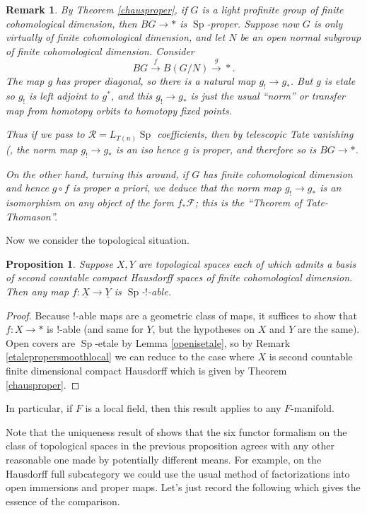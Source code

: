 \documentclass[12pt]{article}
\newtheorem{proposition}[theorem]{Proposition}
\newtheorem{remark}[theorem]{Remark}
\newcommand{\on}{\operatorname}
\newcommand{\mc}{\mathcal}
\begin{document}
\begin{remark}\label{tn}
By Theorem \ref{chausproper}, if $G$ is a light profinite group of finite cohomological dimension, then $BG\to \ast$ is $\on{Sp}$-proper.  Suppose now $G$ is only \emph{virtually} of finite cohomological dimension, and let $N$ be an open normal subgroup of finite cohomological dimension.  Consider
$$BG \overset{f}{\to} B(G/N) \overset{g}{\to} \ast.$$
The map $g$ has proper diagonal, so there is a natural map $g_! \to g_\ast$.  But $g$ is etale so $g_!$ is left adjoint to $g^\ast$, and this $g_! \to g_\ast$ is just the usual ``norm'' or transfer map from homotopy orbits to homotopy fixed points.

Thus if we pass to $\mathcal{R}=L_{T(n)}\on{Sp}$ coefficients, then by telescopic Tate vanishing (\cite{KuhnTate}, the norm map $g_! \to g_\ast$ is an iso hence $g$ is proper, and therefore so is $BG\to \ast$.

On the other hand, turning this around, if $G$ has finite cohomological dimension and hence $g\circ f$ is proper a priori, we deduce that the norm map $g_! \to g_\ast$ is an isomorphism on any object of the form $f_\ast\mc{F}$; this is the ``Theorem of Tate-Thomason''.
\end{remark}

Now we consider the topological situation.

\begin{proposition}\label{LCHaus}
Suppose $X,Y$ are topological spaces each of which admits a basis of second countable compact Hausdorff spaces of finite cohomological dimension.  Then any map $f:\underline{X}\to\underline{Y}$ is $\on{Sp}$-$!$-able.
\end{proposition}
\begin{proof}
Because $!$-able maps are a geometric class of maps, it suffices to show that $f:X \to \ast$ is $!$-able (and same for $Y$, but the hypotheses on $X$ and $Y$ are the same).  Open covers are $\on{Sp}$-etale by Lemma \ref{openisetale}, so by Remark \ref{etalepropersmoothlocal} we can reduce to the case where $X$ is second countable finite dimensional compact Hausdorff which is given by Theorem \ref{chausproper}.
\end{proof}

In particular, if $F$ is a local field, then this result applies to any $F$-manifold.

Note that the uniqueness result of \cite{DauserUniqueness} shows that the six functor formalism on the class of topological spaces in the previous proposition agrees with any other reasonable one made by potentially different means.  For example, on the Hausdorff full subcategory we could use the usual method of factorizations into open immersions and proper maps.  Let's just record the following which gives the essence of the comparison.
\end{document}
